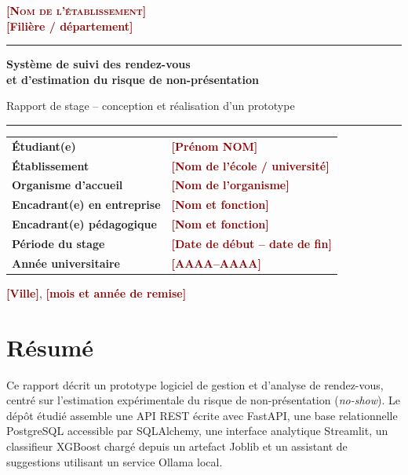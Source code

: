 \documentclass[11pt,a4paper]{report}
\newcommand{\placeholder}[1]{\textcolor{darkred}{\textbf{[#1]}}}
\begin{document}
\begin{titlepage}
  \centering
  \vspace*{1.4cm}
  {\Large\textsc{\placeholder{Nom de l'établissement}}\\[0.35em]
  \large\placeholder{Filière / département}\par}
  \vspace{2.0cm}
  {\color{blue}\rule{\textwidth}{1.2pt}\par}
  \vspace{0.6cm}
  {\Huge\bfseries Système de suivi des rendez-vous\\[0.25em]
  et d'estimation du risque de non-présentation\par}
  \vspace{0.55cm}
  {\Large Rapport de stage -- conception et réalisation d'un prototype\par}
  \vspace{0.6cm}
  {\color{blue}\rule{\textwidth}{1.2pt}\par}
  \vspace{1.8cm}
  \begin{tabular}{>{\bfseries}p{5.0cm}p{8.0cm}}
    Étudiant(e) & \placeholder{Prénom NOM}\\[0.65em]
    Établissement & \placeholder{Nom de l'école / université}\\[0.65em]
    Organisme d'accueil & \placeholder{Nom de l'organisme}\\[0.65em]
    Encadrant(e) en entreprise & \placeholder{Nom et fonction}\\[0.65em]
    Encadrant(e) pédagogique & \placeholder{Nom et fonction}\\[0.65em]
    Période du stage & \placeholder{Date de début -- date de fin}\\[0.65em]
    Année universitaire & \placeholder{AAAA--AAAA}
  \end{tabular}
  \vfill
  {\large \placeholder{Ville}, \placeholder{mois et année de remise}\par}
  \vspace{0.7cm}
\end{titlepage}

\chapter*{Résumé}
Ce rapport décrit un prototype logiciel de gestion et d'analyse de rendez-vous,
centré sur l'estimation expérimentale du risque de non-présentation
(\emph{no-show}). Le dépôt étudié assemble une API REST écrite avec FastAPI, une
base relationnelle PostgreSQL accessible par SQLAlchemy, une interface
analytique Streamlit, un classifieur XGBoost chargé depuis un artefact Joblib et
un assistant de suggestions utilisant un service Ollama local.
\end{document}

